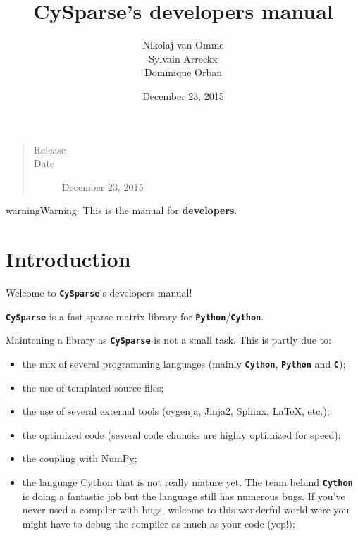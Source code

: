 \documentclass[letterpaper,10pt,english]{sphinxmanual}
\title{CySparse's developers manual}
\date{December 23, 2015}
\author{Nikolaj van Omme\\Sylvain Arreckx\\Dominique Orban}
\begin{document}
\maketitle
\tableofcontents
{}\label{contents::doc}

\begin{quote}\begin{description}
\item[{Release}] 

\item[{Date}] \leavevmode
December 23, 2015

\end{description}\end{quote}

\begin{notice}{warning}{Warning:}
This is the manual for \textbf{developers}.
\end{notice}


\chapter{Introduction}
\label{introduction:introduction}\label{introduction::doc}\label{introduction:cysparse-s-developers-manual}
Welcome to \textbf{\texttt{CySparse}}`s developers manual!

\textbf{\texttt{CySparse}} is a fast sparse matrix library for \textbf{\texttt{Python}}/\textbf{\texttt{Cython}}.

Maintening a library as \textbf{\texttt{CySparse}} is not a small task. This is partly due to:
\begin{itemize}
\item {} 
the mix of several programming languages (mainly \textbf{\texttt{Cython}}, \textbf{\texttt{Python}} and \textbf{\texttt{C}});

\item {} 
the use of templated source files;

\item {} 
the use of several external tools (\href{https://github.com/PythonOptimizers/cygenja}{cygenja}, \href{http://jinja.pocoo.org/}{Jinja2}, \href{http://sphinx-doc.org/}{Sphinx}, \href{https://www.latex-project.org/}{LaTeX}, etc.);

\item {} 
the optimized code (several code chuncks are highly optimized for speed);

\item {} 
the coupling with \href{http://www.numpy.org/}{NumPy};

\item {} 
the language \href{http://cython.org/}{Cython} that is not really mature yet. The team behind \textbf{\texttt{Cython}} is doing a fantastic job but the language still has numerous bugs. If you've never used a compiler with bugs, welcome to this wonderful world were you might have
to debug the compiler as much as your code (yep!);

\end{itemize}
\end{document}
